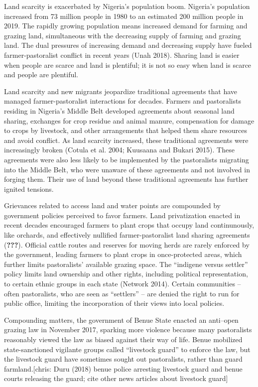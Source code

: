 \documentclass[11pt]{article}
\begin{document}
Land scarcity is exacerbated by Nigeria's population boom. Nigeria's
population increased from 73 million people in 1980 to an estimated 200
million people in 2019. The rapidly growing population means increased
demand for farming and grazing land, simultaneous with the decreasing
supply of farming and grazing land. The dual pressures of increasing
demand and decreasing supply have fueled farmer-pastoralist conflict in
recent years (Unah 2018). Sharing land is easier when people are scarce
and land is plentiful; it is not so easy when land is scarce and people
are plentiful.

Land scarcity and new migrants jeopardize traditional agreements that
have managed farmer-pastoralist interactions for decades. Farmers and
pastoralists residing in Nigeria's Middle Belt developed agreements
about seasonal land sharing, exchanges for crop residue and animal
manure, compensation for damage to crops by livestock, and other
arrangements that helped them share resources and avoid conflict. As
land scarcity increased, these traditional agreements were increasingly
broken (Cotula et al. 2004; Kuusaana and Bukari 2015). These agreements
were also less likely to be implemented by the pastoralists migrating
into the Middle Belt, who were unaware of these agreements and not
involved in forging them. Their use of land beyond these traditional
agreements has further ignited tensions.

Grievances related to access land and water points are compounded by
government policies perceived to favor farmers. Land privatization
enacted in recent decades encouraged farmers to plant crops that occupy
land continunously, like orchards, and effectively nullified
farmer-pastoralist land sharing agreements ({\textbf{???}}). Official
cattle routes and reserves for moving herds are rarely enforced by the
government, leading farmers to plant crops in once-protected areas,
which further limits pastoralists' available grazing space. The
``indigene versus settler'' policy limits land ownership and other
rights, including political representation, to certain ethnic groups in
each state (Network 2014). Certain communities -- often pastoralists,
who are seen as ``settlers'' -- are denied the right to run for public
office, limiting the incorporation of their views into local policies.

Compounding matters, the government of Benue State enacted an anti--open
grazing law in November 2017, sparking more violence because many
pastoralists reasonably viewed the law as biased against their way of
life. Benue mobilized state-sanctioned vigilante groups called
``livestock guard'' to enforce the law, but the livestock guard have
sometimes sought out pastoralists, rather than guard farmland.{[}chris:
Duru (2018) benue police arresting livestock guard and benue courts
releasing the guard; cite other news articles about livestock guard{]}
\end{document}
